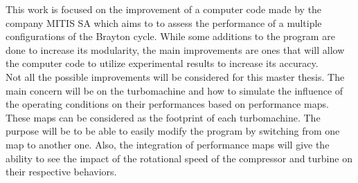 This work is focused on the improvement of a computer code made by the company MITIS SA which aims to to assess the performance of a multiple configurations of the Brayton cycle. While some additions to the program are done to increase its modularity, the main improvements are ones that will allow the computer code to utilize experimental results to increase its accuracy. \\

Not all the possible improvements will be considered for this master thesis. The main concern will be on the turbomachine and how to simulate the influence of the operating conditions on their performances based on performance maps. These maps can be considered as the footprint of each turbomachine.  The purpose will be to be able to easily modify the program by switching from one map to another one. Also, the integration of performance maps will give the ability to see the impact of the rotational speed of the compressor and turbine on their respective behaviors.

